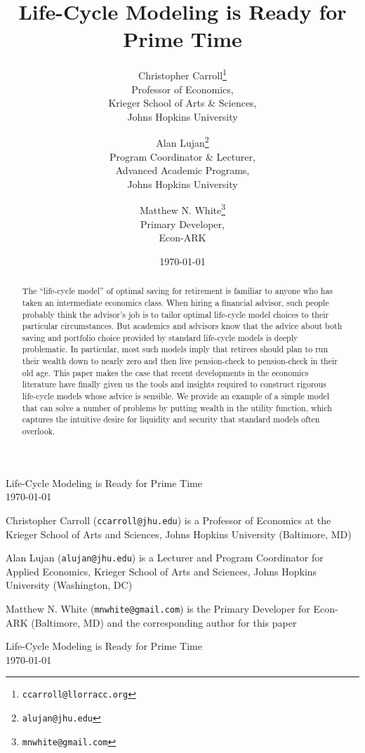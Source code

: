 \documentclass[12pt,letterpaper, fleqn]{article}
\title{Life-Cycle Modeling is Ready for Prime Time}
\date{\today}
\author{Christopher Carroll\footnote{\texttt{ccarroll@llorracc.org}}\\\small{Professor of Economics,}\\\small{Krieger School of Arts \& Sciences,}\\\small{Johns Hopkins University} \and
	Alan Lujan\footnote{\texttt{alujan@jhu.edu}}\\\small{Program Coordinator \& Lecturer,}\\\small{Advanced Academic Programs,}\\\small{Johns Hopkins University} \and Matthew N. White\footnote{\texttt{mnwhite@gmail.com}}\\\small{Primary Developer,}\\\small{Econ-ARK}}
\begin{document}
\begin{singlespace}

\begin{center}
	\huge Life-Cycle Modeling is Ready for Prime Time \\ \LARGE \today
\end{center}

\large

\vspace{2cm}

\noindent Christopher Carroll (\texttt{ccarroll@jhu.edu}) is a Professor of Economics at the Krieger School of Arts and Sciences, Johns Hopkins University (Baltimore, MD)

\vspace{1cm}

\noindent Alan Lujan (\texttt{alujan@jhu.edu}) is a Lecturer and Program Coordinator for Applied Economics, Krieger School of Arts and Sciences, Johns Hopkins University (Washington, DC)

\vspace{1cm}

\noindent Matthew N. White (\texttt{mnwhite@gmail.com}) is the Primary Developer for Econ-ARK (Baltimore, MD) and the corresponding author for this paper

\thispagestyle{empty}

\newpage

\begin{center}
	\huge Life-Cycle Modeling is Ready for Prime Time \\ \LARGE \today
\end{center}

\vspace{1cm}

\begin{abstract}
The ``life-cycle model'' of optimal saving for retirement is familiar to anyone who has taken an intermediate economics class.
When hiring a financial advisor, such people probably think the advisor's job is to tailor optimal life-cycle model choices to their particular circumstances.
But academics and advisors know that the advice about both saving and portfolio choice provided by standard life-cycle models is deeply problematic.
In particular, most such models imply that retirees should plan to run their wealth down to nearly zero and then live pension-check to pension-check in their old age.
This paper makes the case that recent developments in the economics literature have finally given us the tools and insights required to construct rigorous life-cycle models whose advice is sensible.
We provide an example of a simple model that can solve a number of problems by putting wealth in the utility function, which captures the intuitive desire for liquidity and security that standard models often overlook.
\end{abstract}

\end{singlespace}
\end{document}
